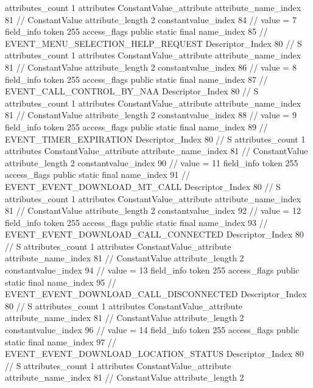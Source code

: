 {{{{{				attributes_count	1
				attributes {
				ConstantValue_attribute {
					attribute_name_index	81		// ConstantValue
					attribute_length	2
					constantvalue_index	84		// value = 7
				}
				}
			}
			field_info {
				token	255
				access_flags	public static final
				name_index	85		// EVENT_MENU_SELECTION_HELP_REQUEST
				Descriptor_Index	80		// S
				attributes_count	1
				attributes {
				ConstantValue_attribute {
					attribute_name_index	81		// ConstantValue
					attribute_length	2
					constantvalue_index	86		// value = 8
				}
				}
			}
			field_info {
				token	255
				access_flags	public static final
				name_index	87		// EVENT_CALL_CONTROL_BY_NAA
				Descriptor_Index	80		// S
				attributes_count	1
				attributes {
				ConstantValue_attribute {
					attribute_name_index	81		// ConstantValue
					attribute_length	2
					constantvalue_index	88		// value = 9
				}
				}
			}
			field_info {
				token	255
				access_flags	public static final
				name_index	89		// EVENT_TIMER_EXPIRATION
				Descriptor_Index	80		// S
				attributes_count	1
				attributes {
				ConstantValue_attribute {
					attribute_name_index	81		// ConstantValue
					attribute_length	2
					constantvalue_index	90		// value = 11
				}
				}
			}
			field_info {
				token	255
				access_flags	public static final
				name_index	91		// EVENT_EVENT_DOWNLOAD_MT_CALL
				Descriptor_Index	80		// S
				attributes_count	1
				attributes {
				ConstantValue_attribute {
					attribute_name_index	81		// ConstantValue
					attribute_length	2
					constantvalue_index	92		// value = 12
				}
				}
			}
			field_info {
				token	255
				access_flags	public static final
				name_index	93		// EVENT_EVENT_DOWNLOAD_CALL_CONNECTED
				Descriptor_Index	80		// S
				attributes_count	1
				attributes {
				ConstantValue_attribute {
					attribute_name_index	81		// ConstantValue
					attribute_length	2
					constantvalue_index	94		// value = 13
				}
				}
			}
			field_info {
				token	255
				access_flags	public static final
				name_index	95		// EVENT_EVENT_DOWNLOAD_CALL_DISCONNECTED
				Descriptor_Index	80		// S
				attributes_count	1
				attributes {
				ConstantValue_attribute {
					attribute_name_index	81		// ConstantValue
					attribute_length	2
					constantvalue_index	96		// value = 14
				}
				}
			}
			field_info {
				token	255
				access_flags	public static final
				name_index	97		// EVENT_EVENT_DOWNLOAD_LOCATION_STATUS
				Descriptor_Index	80		// S
				attributes_count	1
				attributes {
				ConstantValue_attribute {
					attribute_name_index	81		// ConstantValue
					attribute_length	2
}}}}}}}

